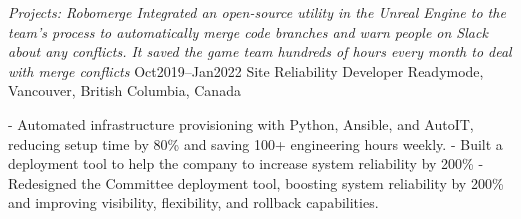 \documentclass[9pt]{developercv} %
\begin{document}
\begin{entrylist}
{            \textit{Projects: Robomerge\newline
            Integrated an open-source utility in the Unreal Engine to the team’s process to automatically merge code branches and warn people on Slack about any conflicts. It saved the game team hundreds of hours every month to deal with merge conflicts\newline}
        }
    \entry
		{Oct2019--Jan2022}
		{Site Reliability Developer}
		{Readymode, Vancouver, British Columbia, Canada}
		{
            - Automated infrastructure provisioning with Python, Ansible, and AutoIT, reducing setup time by 80\% and saving 100+ engineering hours weekly.\newline
            - Built a deployment tool to help the company to increase system reliability by 200\%\newline
            - Redesigned the Committee deployment tool, boosting system reliability by 200\% and improving visibility, flexibility, and rollback capabilities.\newline

}
\end{entrylist}
\end{document}
